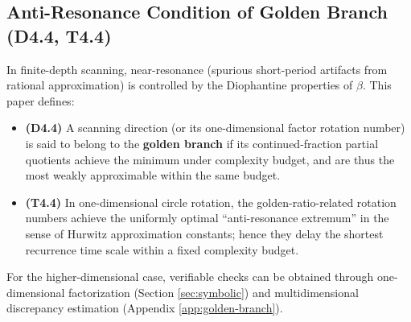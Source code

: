 \subsection{Anti-Resonance Condition of Golden Branch (D4.4, T4.4)}

In finite-depth scanning, near-resonance (spurious short-period artifacts from rational approximation) is controlled by the Diophantine properties of $\beta$. This paper defines:
\begin{itemize}
  \item \textbf{(D4.4)} A scanning direction (or its one-dimensional factor rotation number) is said to belong to the \textbf{golden branch} if its continued-fraction partial quotients achieve the minimum under complexity budget, and are thus the most weakly approximable within the same budget.
  \item \textbf{(T4.4)} In one-dimensional circle rotation, the golden-ratio-related rotation numbers achieve the uniformly optimal ``anti-resonance extremum'' in the sense of Hurwitz approximation constants; hence they delay the shortest recurrence time scale within a fixed complexity budget.
\end{itemize}
For the higher-dimensional case, verifiable checks can be obtained through one-dimensional factorization (Section \ref{sec:symbolic}) and multidimensional discrepancy estimation (Appendix \ref{app:golden-branch}).
